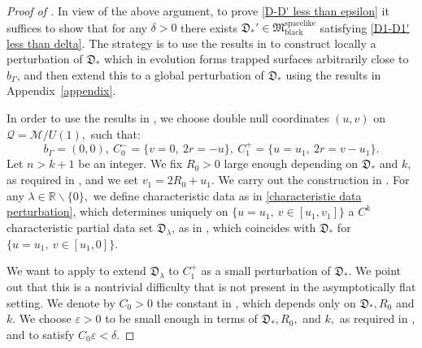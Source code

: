 \documentclass[11pt]{article}
\numberwithin{equation}{section}
\begin{document}
\begin{proof}[Proof of ]
    In view of the above argument, to prove \eqref{D-D' less than epsilon} it suffices to show that for any $\delta>0$ there exists $\mathfrak{D}_*'\in\mathfrak{M}_{\mathrm{black}}^{\mathrm{spacelike}}$ satisfying \eqref{D1-D1' less than delta}. The strategy is to use the results in  to construct locally a perturbation of $\mathfrak{D}_*$ which in evolution forms trapped surfaces arbitrarily close to $b_{\Gamma}$, and then extend this to a global perturbation of $\mathfrak{D}_*$ using the results in Appendix~\ref{appendix}.
    
    In order to use the results in , we choose double null coordinates $(u,v)$ on $\mathcal{Q}=\mathcal{M}/U(1),$ such that: \[b_{\Gamma}=(0,0),\ C_0^-=\big\{v=0,\ 2r=-u\big\},\ C_1^+=\big\{u=u_1,\ 2r=v-u_1\big\}.\]
    Let $n>k+1$ be an integer. We fix $R_0>0$ large enough depending on $\mathfrak{D}_*$ and $k$, as required in , and we set $v_1=2R_0+u_1.$ We carry out the construction in . For any $\lambda\in\mathbb{R}\backslash\{0\},$ we define characteristic data as in \eqref{characteristic data perturbation}, which determines uniquely on $\big\{u=u_1,\ v\in[u_1,v_1]\big\}$ a $C^k$ characteristic partial data set $\mathfrak{D}_{\lambda}$, as in , which coincides with $\mathfrak{D}_*$ for $\big\{u=u_1,\ v\in[u_1,0]\big\}.$ 
    
    We want to apply  to extend $\mathfrak{D}_{\lambda}$ to $C_1^+$ as a small perturbation of $\mathfrak{D}_*.$ We point out that this is a nontrivial difficulty that is not present in the asymptotically flat setting. We denote by $C_0>0$ the constant in , which depends only on $\mathfrak{D}_*, R_0$ and $k.$ We choose $\varepsilon>0$ to be small enough in terms of $\mathfrak{D}_*,R_0,$ and $k,$ as required in , and to satisfy $C_0\varepsilon<\delta.$ 
    

\end{proof}
\end{document}

